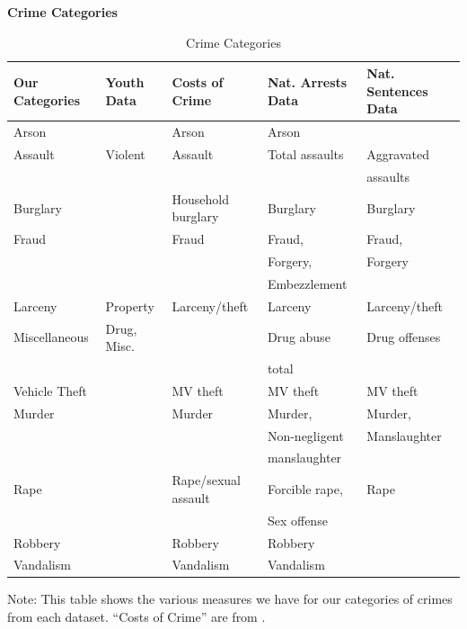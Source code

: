 \documentclass[static]{JJH-Beamer}
\begin{document}
\begin{frame}

\begin{center}
\textbf{Crime Categories}
\end{center}
\begin{table}[H]
\caption{Crime Categories} \label{tab:crime_cat}
\begin{center}
\begin{tabular}{lllll}
\toprule
{Our Categories}	&	{Youth Data} & {Costs of Crime} & {Nat. Arrests Data} & {Nat. Sentences Data}	\\
\midrule
{Arson}			&			& Arson					&	Arson			&					\\	
{Assault}			&	Violent			& Assault				&	Total assaults	& Aggravated 		\\		
				&				&						&					& assaults 			\\ 		
{Burglary}		&				& Household burglary	&	Burglary		& Burglary			\\		
{Fraud}			&				& Fraud					&	Fraud,			& Fraud,			\\		
				&				&						&	Forgery,		& Forgery			\\
				&				&						&	Embezzlement	&					\\		
{Larceny}			&	Property	& Larceny/theft			&	Larceny			& Larceny/theft		\\		
{Miscellaneous}	& 	Drug, Misc.	& 					&	Drug abuse		& Drug offenses		\\		
				&				&						&	total			&					\\ 		
{Vehicle Theft}	&				& MV theft	&	MV theft		& MV theft			\\		
{Murder}			&				& Murder				&	Murder,			& Murder,			\\	
				&				&						& 	Non-negligent 	& Manslaughter		\\
				&				&						& 	manslaughter	&   				\\
{Rape}			&				& Rape/sexual assault	&	Forcible rape, 	& Rape 				\\
				&				&						&	Sex offense		&					\\
{Robbery}			&				& Robbery 				&	Robbery			&					\\
{Vandalism}		&				& Vandalism				&	Vandalism		& 				\\	\bottomrule
\end{tabular}
\end{center}
{\flushleft \tiny Note: This table shows the various measures we have for our categories of crimes from each dataset. ``Costs of Crime'' are from \cite{McCollister_etal_2010_DAD}.\\}
\end{table}

\end{frame}
\end{document}

